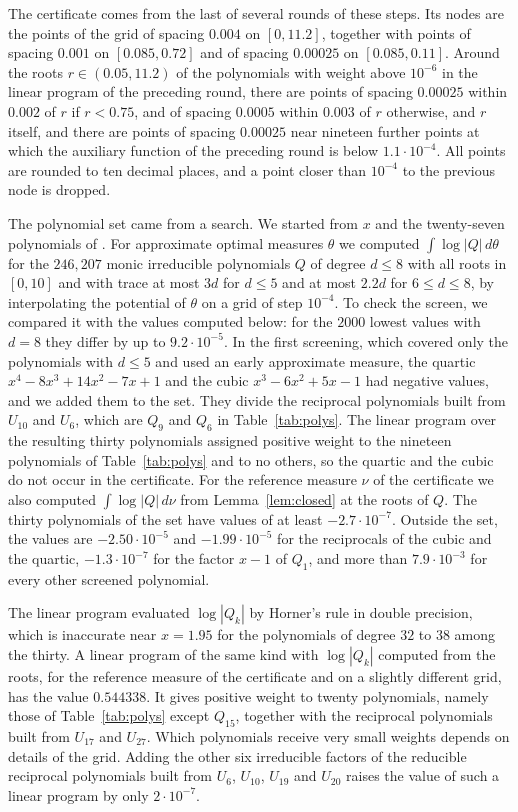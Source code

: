 \documentclass[11pt]{amsart}
\theoremstyle{remark}
\numberwithin{equation}{section}
\begin{document}
The certificate comes from the last of several rounds of these steps. Its nodes are the points of the grid of spacing $0.004$ on $[0,11.2]$, together with points of spacing $0.001$ on $[0.085,0.72]$ and of spacing $0.00025$ on $[0.085,0.11]$. Around the roots $r\in(0.05,11.2)$ of the polynomials with weight above $10^{-6}$ in the linear program of the preceding round, there are points of spacing $0.00025$ within $0.002$ of $r$ if $r<0.75$, and of spacing $0.0005$ within $0.003$ of $r$ otherwise, and $r$ itself, and there are points of spacing $0.00025$ near nineteen further points at which the auxiliary function of the preceding round is below $1.1\cdot10^{-4}$. All points are rounded to ten decimal places, and a point closer than $10^{-4}$ to the previous node is dropped.

The polynomial set came from a search. We started from $x$ and the twenty-seven polynomials of \cite[Table~1]{Fla15}. For approximate optimal measures $\theta$ we computed $\int\log|Q|\,d\theta$ for the $246{,}207$ monic irreducible polynomials $Q$ of degree $d\le8$ with all roots in $[0,10]$ and with trace at most $3d$ for $d\le5$ and at most $2.2d$ for $6\le d\le8$, by interpolating the potential of $\theta$ on a grid of step $10^{-4}$. To check the screen, we compared it with the values computed below: for the $2000$ lowest values with $d=8$ they differ by up to $9.2\cdot10^{-5}$. In the first screening, which covered only the polynomials with $d\le5$ and used an early approximate measure, the quartic $x^4-8x^3+14x^2-7x+1$ and the cubic $x^3-6x^2+5x-1$ had negative values, and we added them to the set. They divide the reciprocal polynomials built from $U_{10}$ and $U_6$, which are $Q_9$ and $Q_6$ in Table~\ref{tab:polys}. The linear program over the resulting thirty polynomials assigned positive weight to the nineteen polynomials of Table~\ref{tab:polys} and to no others, so the quartic and the cubic do not occur in the certificate. For the reference measure $\nu$ of the certificate we also computed $\int\log|Q|\,d\nu$ from Lemma~\ref{lem:closed} at the roots of $Q$. The thirty polynomials of the set have values of at least $-2.7\cdot10^{-7}$. Outside the set, the values are $-2.50\cdot10^{-5}$ and $-1.99\cdot10^{-5}$ for the reciprocals of the cubic and the quartic, $-1.3\cdot10^{-7}$ for the factor $x-1$ of $Q_1$, and more than $7.9\cdot10^{-3}$ for every other screened polynomial.

The linear program evaluated $\log|Q_k|$ by Horner's rule in double precision, which is inaccurate near $x=1.95$ for the polynomials of degree $32$ to $38$ among the thirty. A linear program of the same kind with $\log|Q_k|$ computed from the roots, for the reference measure of the certificate and on a slightly different grid, has the value $0.544338$. It gives positive weight to twenty polynomials, namely those of Table~\ref{tab:polys} except $Q_{15}$, together with the reciprocal polynomials built from $U_{17}$ and $U_{27}$. Which polynomials receive very small weights depends on details of the grid. Adding the other six irreducible factors of the reducible reciprocal polynomials built from $U_6$, $U_{10}$, $U_{19}$ and $U_{20}$ raises the value of such a linear program by only $2\cdot10^{-7}$.
\end{document}
